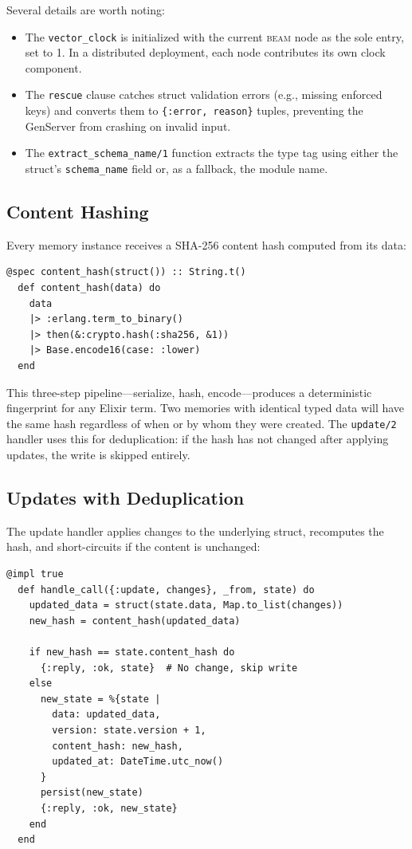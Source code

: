 \documentclass[12pt,a4paper]{article}
\theoremstyle{definition}
\newcommand{\BEAM}{\textsc{beam}}
\begin{document}
Several details are worth noting:

\begin{itemize}
  \item The \texttt{vector\_clock} is initialized with the current \BEAM{} node as the sole entry, set to 1.
  In a distributed deployment, each node contributes its own clock component.
  \item The \texttt{rescue} clause catches struct validation errors (e.g., missing enforced keys) and converts them to \texttt{\{:error, reason\}} tuples, preventing the GenServer from crashing on invalid input.
  \item The \texttt{extract\_schema\_name/1} function extracts the type tag using either the struct's \texttt{schema\_name} field or, as a fallback, the module name.
\end{itemize}

\subsection{Content Hashing}\label{subsec:content-hash}

Every memory instance receives a SHA-256 content hash computed from its data:

\begin{lstlisting}[caption={Content-addressed hashing for deduplication.}, label={lst:content-hash}]
  @spec content_hash(struct()) :: String.t()
  def content_hash(data) do
    data
    |> :erlang.term_to_binary()
    |> then(&:crypto.hash(:sha256, &1))
    |> Base.encode16(case: :lower)
  end
\end{lstlisting}

This three-step pipeline---serialize, hash, encode---produces a deterministic fingerprint for any Elixir term.
Two memories with identical typed data will have the same hash regardless of when or by whom they were created.
The \texttt{update/2} handler uses this for deduplication: if the hash has not changed after applying updates, the write is skipped entirely.

\subsection{Updates with Deduplication}\label{subsec:updates}

The update handler applies changes to the underlying struct, recomputes the hash, and short-circuits if the content is unchanged:

\begin{lstlisting}[caption={Update with content-hash deduplication.}, label={lst:update}]
  @impl true
  def handle_call({:update, changes}, _from, state) do
    updated_data = struct(state.data, Map.to_list(changes))
    new_hash = content_hash(updated_data)

    if new_hash == state.content_hash do
      {:reply, :ok, state}  # No change, skip write
    else
      new_state = %{state |
        data: updated_data,
        version: state.version + 1,
        content_hash: new_hash,
        updated_at: DateTime.utc_now()
      }
      persist(new_state)
      {:reply, :ok, new_state}
    end
  end
\end{lstlisting}
\end{document}
